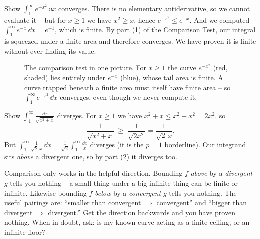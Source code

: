 \begin{example}
\label{ch25:ex-gaussian-tail}
Show $\displaystyle\int_1^{\infty} e^{-x^2}\,\dd x$ converges. There is no
elementary antiderivative, so we cannot evaluate it -- but for $x \ge 1$ we have
$x^2 \ge x$, hence $e^{-x^2} \le e^{-x}$. And we computed
$\int_1^\infty e^{-x}\,\dd x = e^{-1}$, which is finite. By part (1) of the
Comparison Test, our integral is squeezed under a finite area and therefore
converges. We have proven it is finite without ever finding its value.
\end{example}

\begin{figure}[H]
\centering
{}
\caption{The comparison test in one picture. For $x\ge 1$ the curve $e^{-x^2}$
(red, shaded) lies entirely under $e^{-x}$ (blue), whose tail area is finite. A
curve trapped beneath a finite area must itself have finite area -- so
$\int_1^\infty e^{-x^2}\,\dd x$ converges, even though we never compute it.}
\label{ch25:fig-comparison}
\end{figure}

\begin{example}
\label{ch25:ex-divcomp}
Show $\displaystyle\int_1^{\infty}\frac{\dd x}{\sqrt{x^2+x}}$ diverges. For
$x\ge 1$ we have $x^2 + x \le x^2 + x^2 = 2x^2$, so
\[
  \frac{1}{\sqrt{x^2+x}} \;\ge\; \frac{1}{\sqrt{2x^2}} = \frac{1}{\sqrt{2}\,x}.
\]
But $\int_1^\infty \frac{1}{\sqrt 2\,x}\,\dd x = \frac{1}{\sqrt2}\int_1^\infty
\frac{\dd x}{x}$ diverges (it is the $p=1$ borderline). Our integrand sits
\emph{above} a divergent one, so by part (2) it diverges too.
\end{example}

\begin{trapbox}
Comparison only works in the helpful direction. Bounding $f$ \emph{above} by a
\emph{divergent} $g$ tells you nothing -- a small thing under a big infinite thing
can be finite or infinite. Likewise bounding $f$ \emph{below} by a \emph{convergent}
$g$ tells you nothing. The useful pairings are: ``smaller than convergent
$\Rightarrow$ convergent'' and ``bigger than divergent $\Rightarrow$ divergent.''
Get the direction backwards and you have proven nothing. When in doubt, ask: is my
known curve acting as a finite ceiling, or an infinite floor?
\end{trapbox}

